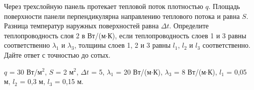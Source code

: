 

Через трехслойную панель протекает тепловой поток плотностью
$q$. Площадь поверхности
панели перпендикулярна направлению теплового потока и равна $S$. Разница температур наружных
поверхностей равна $\Delta t$. Определите
теплопроводность слоя 2 в Вт/(м$\cdot$К), если теплопроводность слоев 1 и 3 равны соответственно
$\lambda_1$ и $\lambda_3$, толщины слоев 1, 2 и 3 равны $l_1$, $l_2$ и $l_3$ соответственно. 
Дайте ответ с точностью до сотых.

$q$ = 30 Вт/м$^2$, $S$ = 2 м$^2$, $\Delta t$ = 5, $\lambda_1$ = 20 Вт/(м$\cdot$К),
$\lambda_3$ = 8 Вт/(м$\cdot$К), $l_1$ = 0,05 м, $l_2$ = 0,3 м, $l_3$ = 0,15 м.